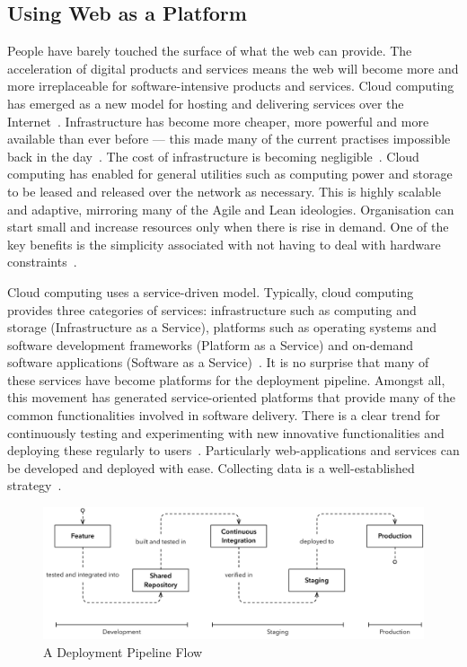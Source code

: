 \documentclass[english]{tktltiki2}
\begin{document}
\subsection{Using Web as a Platform}

People have barely touched the surface of what the web can provide. The acceleration of digital products and services means the web will become more and more irreplaceable for software-intensive products and services. Cloud computing has emerged as a new model for hosting and delivering services over the Internet~\cite{ZCB10}. Infrastructure has become more cheaper, more powerful and more available than ever before — this made many of the current practises impossible back in the day~\cite{Roy70}. The cost of infrastructure is becoming negligible~\cite{ZCB10, Bos12}. Cloud computing has enabled for general utilities such as computing power and storage to be leased and released over the network as necessary. This is highly scalable and adaptive, mirroring many of the Agile and Lean ideologies. Organisation can start small and increase resources only when there is rise in demand. One of the key benefits is the simplicity associated with not having to deal with hardware constraints~\cite{BE12}.

Cloud computing uses a service-driven model. Typically, cloud computing provides three categories of services: infrastructure such as computing and storage (Infrastructure as a Service), platforms such as operating systems and software development frameworks (Platform as a Service) and on-demand software applications (Software as a Service)~\cite{ZCB10}. It is no surprise that many of these services have become platforms for the deployment pipeline. Amongst all, this movement has generated service-oriented platforms that provide many of the common functionalities involved in software delivery. There is a clear trend for continuously testing and experimenting with new innovative functionalities and deploying these regularly to users~\cite{BE12}. Particularly web-applications and services can be developed and deployed with ease. Collecting data is a well-established strategy~\cite{HB14}.

\begin{figure}[h!]

    \centering
    \vspace{1cm}

    \includegraphics[width = \textwidth]{figures/deployment-pipeline-flow}

    \caption{A Deployment Pipeline Flow}
    \label{figure:deployment-pipeline-flow}

    \vspace{1cm}

\end{figure}
\end{document}
